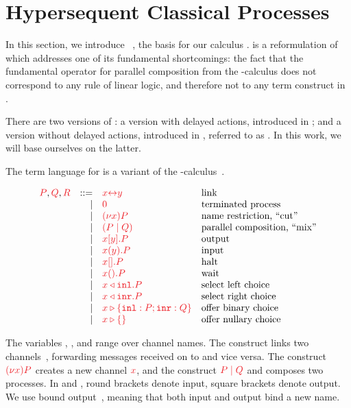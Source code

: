 \documentclass[UKenglish]{llncs}
\begin{document}
\section{Hypersequent Classical Processes}\label{sec:cp-revisited}
In this section, we introduce \dhcp~\parencite{kokke2018tlla,kokke2019pacmpl}, the basis for our calculus \nodcap. \dhcp is a reformulation of \cp which addresses one of its fundamental shortcomings: the fact that the fundamental operator for parallel composition from the \textpi-calculus does not correspond to any rule of linear logic, and therefore not to any term construct in \cp.

There are two versions of \dhcp: a version with delayed actions, introduced in \textcite{kokke2019pacmpl}; and a version without delayed actions, introduced in \textcite{kokke2018tlla}, referred to as \hcp. In this work, we will base ourselves on the latter.

The term language for \hcp is a variant of the \textpi-calculus~\parencite{milner1992b}.
\begin{definition}[Terms]\label{def:hcp-terms}
  \[
    \begin{array}{lrll}
      \tm{P}, \tm{Q}, \tm{R}
        & ::=& \tm{\cpLink{x}{y}}    &\text{link}
      \\&\mid& \tm{\piHalt}          &\text{terminated process}
      \\&\mid& \tm{\piNew{x}{P}}     &\text{name restriction, ``cut''}
      \\&\mid& \tm{( \piPar{P}{Q} )} &\text{parallel composition, ``mix''}
      \\&\mid& \tm{\piSend{x}{y}{P}} &\text{output}
      \\&\mid& \tm{\piRecv{x}{y}{P}} &\text{input}
      \\&\mid& \tm{\piSend{x}{}{P}}  &\text{halt}
      \\&\mid& \tm{\cpWait{x}{}{P}}  &\text{wait}
      \\&\mid& \tm{\cpInl{x}{P}}     &\text{select left choice}
      \\&\mid& \tm{\cpInr{x}{P}}     &\text{select right choice}
      \\&\mid& \tm{\cpCase{x}{P}{Q}} &\text{offer binary choice}
      \\&\mid& \tm{\cpAbsurd{x}}     &\text{offer nullary choice}
    \end{array}
  \]
\end{definition}\noindent
The variables , ,  and  range over channel names. The construct  links two channels~\parencite{sangiorgi1996,boreale1998}, forwarding messages received on  to  and vice versa. The construct $\tm{\piNew{x}{P}}$ creates a new channel $\tm{x}$, and the construct $\tm{\piPar{P}{Q}}$ and composes two processes. In  and , round brackets denote input, square brackets denote output. We use bound output~\parencite{sangiorgi1996}, meaning that both input and output bind a new name. 
\end{document}

